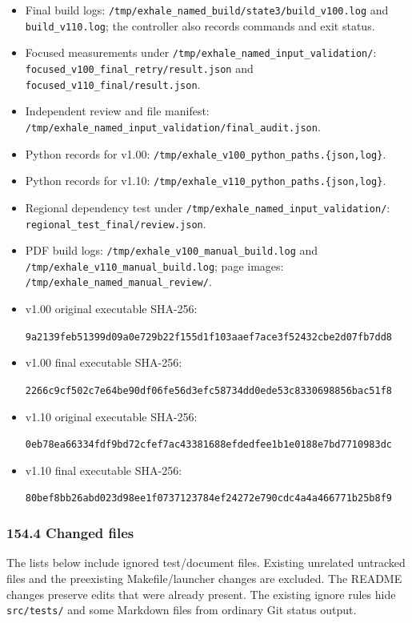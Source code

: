 \documentclass[english,a4paper]{my_memo}
\begin{document}
\begin{itemize}
\item
  Final build logs: \texttt{/tmp/exhale\_named\_build/state3/build\_v100.log} and
  \texttt{build\_v110.log}; the controller also records commands and exit status.
\item
  Focused measurements under \texttt{/tmp/exhale\_named\_input\_validation/}:
  \texttt{focused\_v100\_final\_retry/result.json} and \texttt{focused\_v110\_final/result.json}.
\item
  Independent review and file manifest: \texttt{/tmp/exhale\_named\_input\_validation/final\_audit.json}.
\item
  Python records for v1.00: \texttt{/tmp/exhale\_v100\_python\_paths.\{json,log\}}.
\item
  Python records for v1.10: \texttt{/tmp/exhale\_v110\_python\_paths.\{json,log\}}.
\item
  Regional dependency test under \texttt{/tmp/exhale\_named\_input\_validation/}:
  \texttt{regional\_test\_final/review.json}.
\item
  PDF build logs: \texttt{/tmp/exhale\_v100\_manual\_build.log} and
  \texttt{/tmp/exhale\_v110\_manual\_build.log}; page images: \texttt{/tmp/exhale\_named\_manual\_review/}.
\item
  v1.00 original executable SHA-256:

  \texttt{9a2139feb51399d09a0e729b22f155d1f103aaef7ace3f52432cbe2d07fb7dd8}
\item
  v1.00 final executable SHA-256:

  \texttt{2266c9cf502c7e64be90df06fe56d3efc58734dd0ede53c8330698856bac51f8}
\item
  v1.10 original executable SHA-256:

  \texttt{0eb78ea66334fdf9bd72cfef7ac43381688efdedfee1b1e0188e7bd7710983dc}
\item
  v1.10 final executable SHA-256:

  \texttt{80bef8bb26abd023d98ee1f0737123784ef24272e790cdc4a4a466771b25b8f9}
\end{itemize}

\subsubsection{154.4 Changed files}\label{1544-changed-files}

The lists below include ignored test/document files. Existing unrelated
untracked files and the preexisting Makefile/launcher changes are excluded.
The README changes preserve edits that were already present. The existing
ignore rules hide \texttt{src/tests/} and some Markdown files from ordinary Git
status output.
\end{document}
